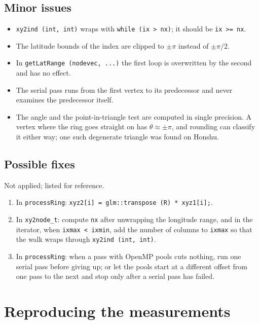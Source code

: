 \documentclass[11pt,a4paper]{article}
\newcommand{\code}[1]{\texttt{#1}}
\begin{document}
\subsection{Minor issues}

\begin{itemize}
\item \code{xy2ind (int, int)} wraps with \code{while (ix > nx)}; it should be \code{ix >= nx}.
\item The latitude bounds of the index are clipped to $\pm\pi$ instead of $\pm\pi/2$.
\item In \code{getLatRange (nodevec, ...)} the first loop is overwritten by the second and has no
  effect.
\item The serial pass runs from the first vertex to its predecessor and never examines the
  predecessor itself.
\item The angle and the point-in-triangle test are computed in single precision. A vertex where
  the ring goes straight on has $\theta\approx\pm\pi$, and rounding can classify it either way; one
  such degenerate triangle was found on Honshu.
\end{itemize}

\subsection{Possible fixes}

Not applied; listed for reference.
\begin{enumerate}
\item In \code{processRing}: \code{xyz2[i] = glm::transpose (R) * xyz1[i];}.
\item In \code{xy2node\_t}: compute \code{nx} after unwrapping the longitude range, and in the
  iterator, when \code{ixmax < ixmin}, add the number of columns to \code{ixmax} so that the walk
  wraps through \code{xy2ind (int, int)}.
\item In \code{processRing}: when a pass with OpenMP pools cuts nothing, run one serial pass
  before giving up; or let the pools start at a different offset from one pass to the next and
  stop only after a serial pass has failed.
\end{enumerate}

\appendix
\section{Reproducing the measurements}
\label{sec:repro}
\end{document}
